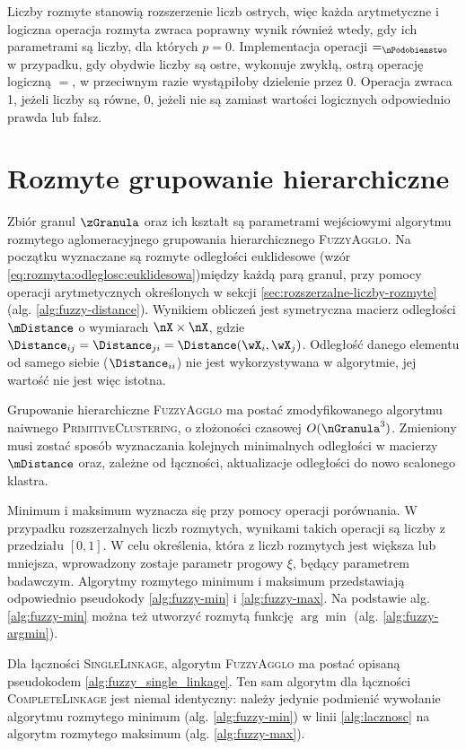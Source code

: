\documentclass[a4paper,twoside,12pt]{book}
\newcommand{\procedura}[1]{\textsc{#1}}
\newcommand{\PrimitiveClustering}{\procedura{Pri\-mi\-ti\-ve\-Clu\-s\-te\-r\-ing}}
\newcommand{\SingleLinkage}{\procedura{Si\-ng\-le\-Lin\-ka\-ge}}
\newcommand{\CompleteLinkage}{\procedura{Com\-ple\-te\-Lin\-ka\-ge}}
\newcommand{\MojHierAlg}{\procedura{FuzzyAgglo}}
\begin{document}
Liczby rozmyte stanowią rozszerzenie liczb ostrych, więc każda arytmetyczne i logiczna operacja rozmyta zwraca poprawny wynik również wtedy, gdy ich parametrami są liczby, dla których $p=0$. Implementacja operacji $=_\nPodobienstwo$ w przypadku, gdy obydwie liczby są ostre, wykonuje zwykłą, ostrą operację logiczną $=$, w przeciwnym razie wystąpiłoby dzielenie przez 0. Operacja zwraca 1, jeżeli liczby są równe, 0, jeżeli nie są zamiast wartości logicznych odpowiednio prawda lub fałsz.

\section{Rozmyte grupowanie hierarchiczne}
\label{sec:rozmyte-grupowanie-hierarchiczne}

Zbiór granul $\zGranula$ oraz ich kształt są parametrami wejściowymi algorytmu rozmytego aglomeracyjnego grupowania hierarchicznego \MojHierAlg.
%
Na początku wyznaczane są rozmyte odległości euklidesowe (wzór \eqref{eq:rozmyta:odleglosc:euklidesowa})między każdą parą granul, przy pomocy operacji arytmetycznych określonych w sekcji \ref{sec:rozszerzalne-liczby-rozmyte} (alg. \ref{alg:fuzzy-distance}). Wynikiem obliczeń jest symetryczna macierz odległości $\mDistance$ o wymiarach $\nX \times \nX$, gdzie $\Distance_{ij} = \Distance_{ji} = \Distance(\wX_{i}, \wX_{j})$. Odległość danego elementu od samego siebie ($\Distance_{ii}$) nie jest wykorzystywana w algorytmie, jej wartość nie jest więc istotna.

Grupowanie hierarchiczne \MojHierAlg{} ma postać zmodyfikowanego algorytmu naiwnego \PrimitiveClustering{}, o złożoności czasowej $O(\nGranula^{3})$. Zmieniony musi zostać sposób wyznaczania kolejnych minimalnych odległości w macierzy $\mDistance$ oraz, zależne od łączności, aktualizacje odległości do nowo scalonego klastra. 

Minimum i maksimum wyznacza się przy pomocy operacji porównania. W przypadku rozszerzalnych liczb rozmytych, wynikami takich operacji są liczby z przedziału $[0, 1]$. W celu określenia, która z liczb rozmytych jest większa lub mniejsza, wprowadzony zostaje parametr progowy $\xi$, będący parametrem badawczym. Algorytmy rozmytego minimum i maksimum przedstawiają odpowiednio pseudokody \ref{alg:fuzzy-min} i \ref{alg:fuzzy-max}. Na podstawie alg. \ref{alg:fuzzy-min} można też utworzyć rozmytą funkcję $\arg\min$ (alg. \ref{alg:fuzzy-argmin}).

Dla łączności \SingleLinkage{}, algorytm \MojHierAlg{} ma postać opisaną pseudokodem \ref{alg:fuzzy_single_linkage}. Ten sam algorytm dla łączności \CompleteLinkage{} jest niemal identyczny: należy jedynie podmienić wywołanie algorytmu rozmytego minimum (alg. \ref{alg:fuzzy-min}) w linii \ref{alg:lacznosc} na algorytm rozmytego maksimum (alg. \ref{alg:fuzzy-max}).
\end{document}
